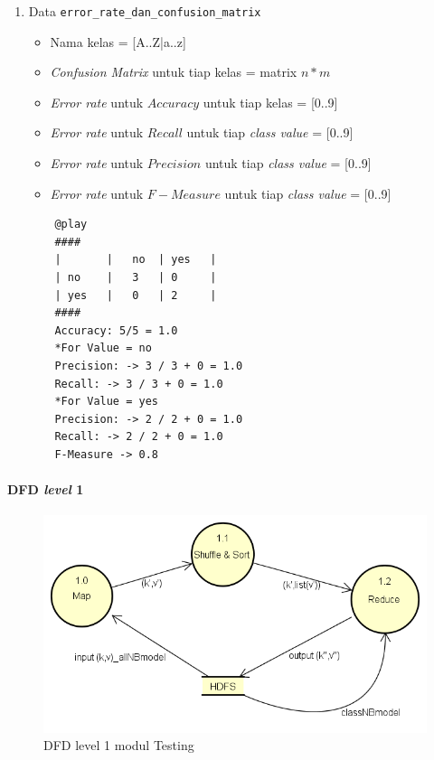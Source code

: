 \begin{enumerate}
	\item{Data \verb|error_rate_dan_confusion_matrix|}
	\begin{itemize}
		\item Nama kelas = [A..Z|a..z]
		\item \textit{Confusion Matrix} untuk tiap kelas = matrix $n*m$
		\item \textit{Error rate} untuk $Accuracy$ untuk tiap kelas = [0..9]
		\item \textit{Error rate} untuk $Recall$ untuk tiap \textit{class value} = [0..9]
		\item \textit{Error rate} untuk $Precision$ untuk tiap \textit{class value} = [0..9]
		\item \textit{Error rate} untuk $F-Measure$ untuk tiap \textit{class value} = [0..9]
	\end{itemize}
	\begin{lstlisting}
	@play
	####
	|		|	no	| yes	|
	| no	|	3	| 0		|
	| yes	|	0	| 2		|
	####
	Accuracy: 5/5 = 1.0
	*For Value = no
	Precision: -> 3 / 3 + 0 = 1.0
	Recall: -> 3 / 3 + 0 = 1.0 
	*For Value = yes
	Precision: -> 2 / 2 + 0 = 1.0
	Recall: -> 2 / 2 + 0 = 1.0
	F-Measure -> 0.8
	\end{lstlisting}
	
\end{enumerate}


\paragraph{DFD \textit{level} 1}
\label{par:DFD level 1 modul Testing}

\begin{figure}[H]
	\centering
	\includegraphics[scale=0.65]{Diagram/DFD_1_0_Testing_rdmodel}
	\caption[DFD level 1 modul Testing]{DFD level 1 modul Testing}
	\label{fig:DFD level 1 modul Testing}
\end{figure}

